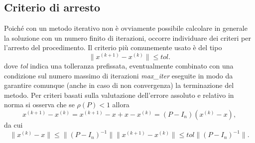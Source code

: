 \documentclass[12pt]{article}
\begin{document}
\subsection{Criterio di arresto}
Poiché con un metodo iterativo non è ovviamente possibile calcolare in generale la soluzione con un numero finito di iterazioni, occorre individuare dei criteri per l'arresto del procedimento. Il criterio più comunemente usato è del tipo
\begin{equation*}
    \|x^{(k+1)}-x^{(k)}\| \leq tol.
\end{equation*}
dove \textit{tol} indica una tolleranza prefissata, eventualmente combinato con una condizione sul numero massimo di iterazioni \textit{max\_iter} eseguite in modo da garantire comunque (anche in caso di non convergenza) la terminazione del metodo.
Per criteri basati sulla valutazione dell'errore assoluto e relativo in norma si osserva che se \(\rho(P)<1\) allora
\begin{equation*}
    x^{(k+1)}-x^{(k)}=x^{(k+1)}-x+x-x^{(k)}=(P-I_n)(x^{(k)}-x),
\end{equation*}
da cui
\begin{equation*}
    \|x^{(k)}-x\| \leq \|(P-I_n)^{-1}\|\|x^{(k+1)}-x^{(k)}\| \leq tol\|(P-I_n)^{-1}\|.
\end{equation*}
\end{document}

